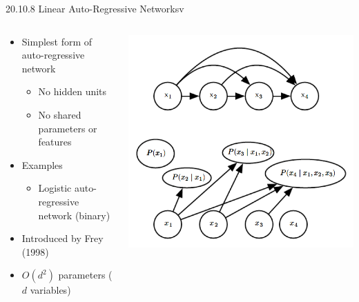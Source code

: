\documentclass[dvipdfmx,presentation]{beamer}
\begin{document}
\begin{frame}[label={sec:orgheadline39}]{20.10.8 Linear Auto-Regressive Networksv}
\begin{columns}
\begin{column}{0.60\columnwidth}
\begin{itemize}
\item Simplest form of auto-regressive network
\begin{itemize}
\item No hidden units
\item No shared parameters or features
\end{itemize}
\item Examples
\begin{itemize}
\item Logistic auto-regressive network (binary)
\end{itemize}
\item Introduced by Frey (1998)
\item \(O(d^{2})\) parameters (\(d\) variables)
\end{itemize}
\end{column}
\begin{column}{0.40\columnwidth}
\includegraphics[width=\textwidth]{./figure/dlbook_fig20_8.png}
\end{column}
\end{columns}
\end{frame}
\end{document}
